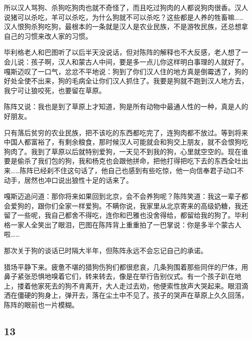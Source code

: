 \par 所以汉人骂狗、杀狗吃狗肉也就不奇怪了，而且吃过狗肉的人都说狗肉很香。汉人说猪可以杀吃，羊可以杀吃，为什么狗就不可以杀吃？这些都是人养的牲畜嘛……汉人恨狗杀狗吃狗，最根本的一条就是汉人是农业民族，不是游牧民族，还总想拿自己的习惯来改人家的习惯。
\par 毕利格老人和巴图听了以后半天没说话，但对陈阵的解释也不大反感，老人想了一会儿说：孩子啊，汉人和蒙古人中间，要是多一点儿你这样明白事理的人就好了。嘎斯迈叹了一口气，忿忿不平地说：狗到了你们汉人住的地方真是倒霉透了，狗的好处全使不出来，狗的毛病全让你们汉人抓住了。我要是狗就不跑到汉人地方去，我宁可让狼咬死，也要留在草原。
\par 陈阵又说：我也是到了草原上才知道，狗是所有动物中最通人性的一种，真是人的好朋友。
\par 只有落后贫穷的农业民族，把不该吃的东西都吃完了，连狗肉都不放过。等到将来中国人都富裕了，有剩余粮食，那时候汉人可能就会和狗交上朋友，就不会恨狗吃狗肉了。我到了草原以后就特别爱狗，一天见不到我的狗，心里就空空的。现在谁要是偷杀了我们包的狗，我和杨克也会跟他拼命，把他打得把吃下去的东西全吐出来……陈阵已经刹不住这句话了，他自己也感到有些吃惊，他一向信奉君子动口不动手，居然也冲口说出狼性十足的话来了。
\par 嘎斯迈追问道：那你将来如果回到北京，会不会养狗呢？陈阵笑道：我这一辈子都会爱狗的，跟你们全家一样爱狗。不瞒你说，我家里从北京寄来的高级奶糖，我还留了一些呢，我自己都舍不得吃，连你和巴雅也没舍得给，都留给我的狗了。毕利格一家人全笑出了眼泪，巴图在陈阵背上重重拍了一巴掌说：你是多半个蒙古人啦……
\par 那次关于狗的谈话已时隔大半年，但陈阵永远不会忘记自己的承诺。
\par 猎场平静下来。疲惫不堪的猎狗伤狗们都很悲哀，几条狗围着那些同伴的尸体，用鼻子紧张恐惧地嗅着它们，转来转去，像是在举行告别仪式。有一个孩子趴在地上，搂着他家死去的狗不肯离开，大人走过去劝，他便索性放声大哭起来。眼泪滴洒在僵硬的狗身上，弹开去，落在尘土中不见了。孩子的哭声在草原上久久回荡，陈阵的眼前也一片模糊。
    

\subsection*{13}




